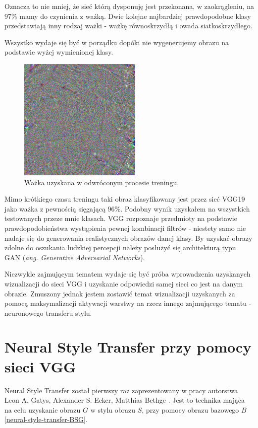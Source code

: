 Oznacza to nie mniej, że sieć którą dysponuję jest przekonana, w zaokrągleniu, na 97\% mamy do czynienia z ważką. Dwie kolejne najbardziej prawdopodobne klasy przedstawiają inny rodzaj ważki - ważkę równoskrzydłą i owada siatkoskrzydłego.

Wszystko wydaje się być w porządku dopóki nie wygenerujemy obrazu na podstawie wyżej wymienionej klasy.

\begin{figure}[ht]
\centerline{\includegraphics[scale=0.8]{resources/vgg_mean_topincluded/dragonfly-fake.png}}
\caption{Ważka uzyskana w odwróconym procesie treningu.}
\label{fig:wazka-fake}
\end{figure}

Mimo krótkiego czasu treningu taki obraz klasyfikowany jest przez sieć VGG19 jako ważka z pewnością sięgającą 96\%. Podobny wynik uzyskałem na wszystkich testowanych przeze mnie klasach. VGG rozpoznaje przedmioty na podstawie prawdopodobieństwa wystąpienia pewnej kombinacji filtrów - niestety samo nie nadaje się do generowania realistycznych obrazów danej klasy. 
By uzyskać obrazy zdolne do oszukania ludzkiej percepcji należy posłużyć się architekturą typu GAN (\textit{ang. Generative Adversarial Networks}).

Niezwykle zajmującym tematem wydaje się być próba wprowadzenia uzyskanych wizualizacji do sieci VGG i uzyskanie odpowiedzi samej sieci co jest na danym obrazie. 
Zmuszony jednak jestem zostawić temat wizualizacji uzyskanych za pomocą maksymalizacji aktywacji warstwy na rzecz innego zajmującego tematu - neuronowego transferu stylu.

\section{Neural Style Transfer przy pomocy sieci VGG}
\label{vgg-nst}
Neural Style Transfer został pierwszy raz zaprezentowany w pracy autorstwa Leon A. Gatys, Alexander S. Ecker, Matthias Bethge \cite{nstpaper}.
Jest to technika mająca na celu uzyskanie obrazu \(G\) w stylu obrazu \(S\), przy pomocy obrazu bazowego \(B\) \ref{neural-style-transfer-BSG}.

